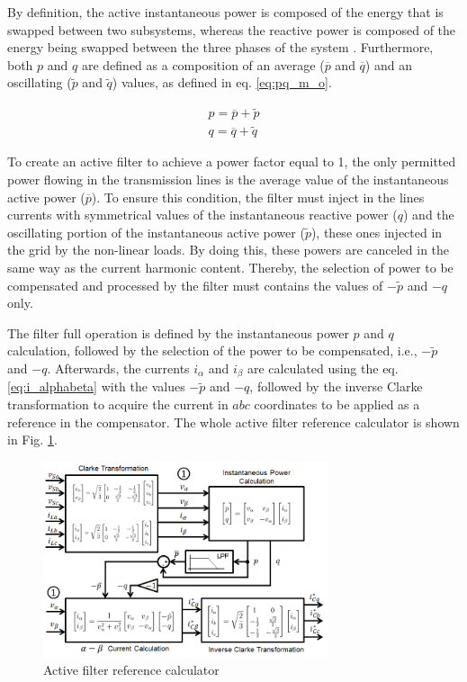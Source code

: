 By definition, the active instantaneous power is composed of the energy that is swapped between two subsystems, whereas the reactive power is composed of the energy being swapped between the three phases of the system \citep{Akagi1984,Peng1996}. Furthermore, both $p$ and $q$ are defined as a composition of an average ($\overline{p}$ and $\overline{q}$) and an oscillating ($\tilde{p}$ and $\tilde{q}$) values, as defined in eq. \ref{eq:pq_m_o}.

\begin{equation}
\begin{aligned}
p = \overline{p} + \tilde{p}\\
q = \overline{q} + \tilde{q} 
\end{aligned}
\label{eq:pq_m_o}
\end{equation} 

To create an active filter to achieve a power factor equal to 1, the only permitted power flowing in the transmission lines is the average value of the instantaneous active power ($\overline{p}$). To ensure this condition, the filter must inject in the lines currents with symmetrical values of the instantaneous reactive power ($q$) and the oscillating portion of the instantaneous active power ($\tilde{p}$), these ones injected in the grid by the non-linear loads. By doing this, these powers are canceled in the same way as the current harmonic content. Thereby, the selection of power to be compensated and processed by the filter must contains the values of $-\tilde{p}$ and $-q$ only.

The filter full operation is defined by the instantaneous power $p$ and $q$ calculation, followed by the selection of the power to be compensated, i.e., $-\tilde{p}$ and $-q$. Afterwards, the currents $i_{\alpha}$ and $i_{\beta}$ are calculated using the eq. \ref{eq:i_alphabeta} with the values $-\tilde{p}$ and $-q$, followed by the inverse Clarke transformation to acquire the current in $abc$ coordinates to be applied as a reference in the compensator. The whole active filter reference calculator is shown in Fig. \ref{fig:diagrama_filtro.png}.

\begin{figure}[!th]
	\centering
	\includegraphics[width=0.75\textwidth]{Figures/diagrama_filtro.png}
	\caption{Active filter reference calculator}
	\label{fig:diagrama_filtro.png}
\end{figure}

